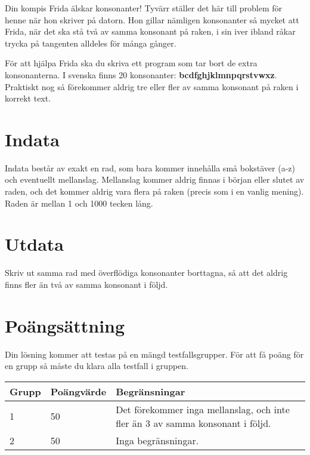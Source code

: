 Din kompis Frida älskar konsonanter! Tyvärr ställer det här till problem för henne när hon skriver på datorn. Hon gillar nämligen konsonanter så mycket att Frida, när det ska stå två av samma konsonant på raken, i sin iver ibland råkar trycka på tangenten alldeles för många gånger.

För att hjälpa Frida ska du skriva ett program som tar bort de extra konsonanterna. I svenska finns 20 konsonanter: \textbf{bcdfghjklmnpqrstvwxz}. Praktiskt nog så förekommer aldrig tre eller fler av samma konsonant på raken i korrekt text.

\section*{Indata}
Indata består av exakt en rad, som bara kommer innehålla små bokstäver (a-z) och eventuellt mellanslag. Mellanslag kommer aldrig finnas i början eller slutet av raden, och det kommer aldrig vara flera på raken (precis som i en vanlig mening). Raden är mellan 1 och 1000 tecken lång.

\section*{Utdata}
Skriv ut samma rad med överflödiga konsonanter borttagna, så att det aldrig finns fler än två av samma konsonant i följd.

\section*{Poängsättning}
Din lösning kommer att testas på en mängd testfallsgrupper.
För att få poäng för en grupp så måste du klara alla testfall i gruppen.

\noindent
\begin{tabular}{| l | l | l |}
\hline
Grupp & Poängvärde & Begränsningar \\ \hline
1     & 50          &  Det förekommer inga mellanslag, och inte fler än 3 av samma konsonant i följd.\\ \hline
2     & 50         &  Inga begränsningar. \\ \hline
\end{tabular}

